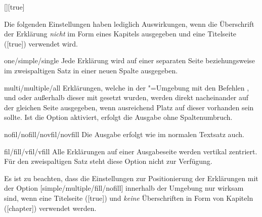 \begin{Declaration}{[\PSet]}[true]
\begin{values}
\end{values}
%
Die folgenden Einstellungen haben lediglich Auswirkungen, wenn die Überschrift 
der Erklärung \emph{nicht} im Form eines Kapitels ausgegeben und eine 
Titelseite ([true]) verwendet wird.
%
\begin{values}
\item[one/simple/single]Jede Erklärung wird auf einer separaten Seite
  beziehungsweise im zweispaltigen Satz in einer neuen Spalte ausgegeben.
\item[multi/multiple/all]
  Erklärungen, welche in der "=Umgebung mit den 
  Befehlen ,  und  oder 
  außerhalb dieser mit  gesetzt wurden, werden direkt 
  nacheinander auf der gleichen Seite ausgegeben, wenn ausreichend Platz auf 
  dieser vorhanden sein sollte. Ist die Option  aktiviert, 
  erfolgt die Ausgabe ohne Spaltenumbruch.
\item[nofil/nofill/novfil/novfill]
  Die Ausgabe erfolgt wie im normalen Textsatz auch.
\item[fil/fill/vfil/vfill]
  Alle Erklärungen auf einer Ausgabeseite werden vertikal zentriert. Für 
  den zweispaltigen Satz steht diese Option nicht zur Verfügung.
\end{values}
%
Es ist zu beachten, dass die Einstellungen zur Positionierung der Erklärungen 
mit der Option [simple/multiple/fill/nofill] innerhalb der 
Umgebung  nur wirksam sind, wenn eine Titelseite 
([true]) und \emph{keine} Überschriften in Form von Kapiteln 
([chapter]) verwendet werden.
\end{Declaration}

